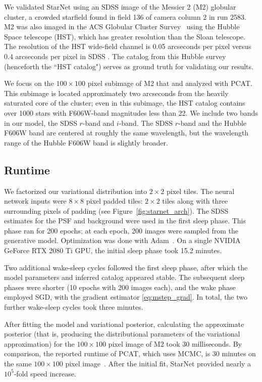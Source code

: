 \label{sec:results_on_m2}
We validated StarNet using an SDSS image of the Messier 2 (M2) globular cluster, a crowded starfield found in field 136 of camera column 2 in run 2583.
M2 was also imaged in the ACS Globular Cluster Survey~\citep{Sarajedini_2007}
using the Hubble Space telescope (HST),
which has greater resolution than the Sloan telescope. 
The resolution of the HST wide-field channel is 0.05 arcseconds per pixel versus 0.4 arcseconds per pixel in SDSS \citep{hubble_about, sdss_about}. 
The catalog from this Hubble survey (henceforth the ``HST catalog") serves as ground truth for validating our results.

We focus on the $100 \times 100$ pixel subimage of M2 that \cite{Portillo_2017} and \cite{Feder_2019} analyzed with PCAT.
This subimage is located approximately two arcseconds from the heavily saturated core of the cluster;
even in this subimage, the HST catalog contains over 1000 stars with F606W-band magnitudes less than 22.
We include two bands in our model, the SDSS $r$-band and $i$-band. 
The SDSS $r$-band and the Hubble F606W band are centered at roughly the same wavelength, but the wavelength range of the Hubble F606W band is slightly broader. 

\subsection{Runtime} 
\label{sec:runtime}
We factorized our variational distribution into $2\times2$ pixel tiles. 
The neural network inputs were $8\times8$ pixel padded tiles: 
$2\times 2$ tiles along with three surrounding pixels of padding (see Figure~\ref{fig:starnet_arch}). 
The SDSS estimates for the PSF and background were used in the first sleep phase. 
This phase ran for 200 epochs; at each epoch, 200 images were sampled from the generative model. 
Optimization was done with Adam~\citep{kingma2014adam}. 
On a single NVIDIA GeForce RTX 2080 Ti GPU, 
the initial sleep phase took 15.2 minutes.

Two additional wake-sleep cycles followed the first sleep phase, 
after which the model parameters and inferred catalog appeared stable.
The subsequent sleep phases were shorter (10 epochs with 200 images each), and the wake phase employed SGD, with the gradient estimator \eqref{eq:mstep_grad}. In total, the two further wake-sleep cycles took three minutes. 

After fitting the model and variational posterior, calculating the approximate posterior (that is, producing the distributional parameters of the variational approximation) for the $100 \times 100$ pixel image of M2 took $30$ milliseconds. 
By comparison, the reported runtime of PCAT, which uses MCMC, is 30 minutes on the same $100 \times 100$ pixel image~\citep{Feder_2019}.
After the initial fit, StarNet provided nearly a $10^5$-fold speed increase. 

